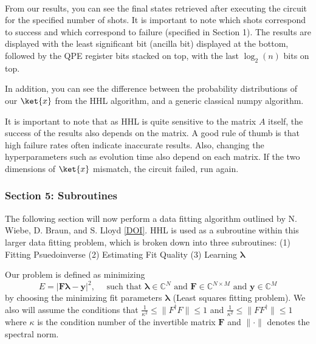 \documentclass[11pt]{article}
\begin{document}
    \begin{center}
    \end{center}
    { \hspace*{\fill} \\}
    
    From our results, you can see the final states retrieved after executing
the circuit for the specified number of shots. It is important to note
which shots correspond to success and which correspond to failure
(specified in Section 1). The results are displayed with the least
significant bit (ancilla bit) displayed at the bottom, followed by the
QPE register bits stacked on top, with the last \(\log_2(n)\) bits on
top.

In addition, you can see the difference between the probability
distributions of our \(\ket{x}\) from the HHL algorithm, and a generic
classical numpy algorithm.

It is important to note that as HHL is quite sensitive to the matrix
\(A\) itself, the success of the results also depends on the matrix. A
good rule of thumb is that high failure rates often indicate inaccurate
results. Also, changing the hyperparameters such as evolution time also
depend on each matrix. If the two dimensions of \(\ket{x}\) mismatch,
the circuit failed, run again.

    \subsubsection{Section 5: Subroutines}\label{section-5-subroutines}

The following section will now perform a data fitting algorithm outlined
by N. Wiebe, D. Braun, and S. Lloyd
\href{https://journals.aps.org/prl/abstract/10.1103/PhysRevLett.109.050505\#fulltext}{{[}DOI{]}}.
HHL is used as a subroutine within this larger data fitting problem,
which is broken down into three subroutines: (1) Fitting Psuedoinverse
(2) Estimating Fit Quality (3) Learning \(\boldsymbol{\lambda}\)

Our problem is defined as minimizing
\[E = |\mathbf{F}\boldsymbol{\lambda} - \mathbf{y}|^2, \quad\text{ such that } \boldsymbol{\lambda} \in \mathbb{C}^N \text{ and } \mathbf{F} \in \mathbb{C}^{N \times M} \text{ and } \mathbf{y} \in \mathbb{C}^{M}\]
by choosing the minimizing fit parameters \(\boldsymbol{\lambda}\)
(Least squares fitting problem). We also will assume the conditions that
\(\frac{1}{\kappa^2} \leq \| F^{\dagger} F \| \leq 1\) and
\(\frac{1}{\kappa^2} \leq \| F F^{\dagger}\| \leq 1\) where \(\kappa\)
is the condition number of the invertible matrix \(\mathbf{F}\) and
\(\|\cdot\|\) denotes the spectral norm.
\end{document}
